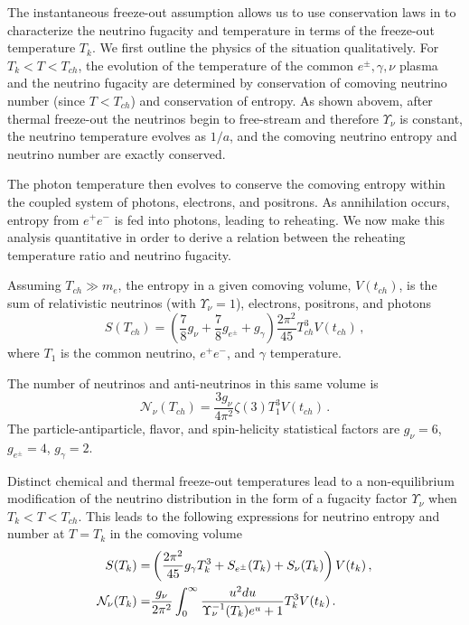 The instantaneous freeze-out assumption allows us to use conservation laws in  to characterize the neutrino fugacity and temperature in terms of the freeze-out temperature $T_k$.  We first outline the physics of the situation qualitatively. For $T_k<T<T_{ch}$, the evolution of the temperature of the common $e^\pm,\gamma,\nu$ plasma and the neutrino fugacity are determined by conservation of comoving neutrino number (since $T<T_{ch}$) and conservation of entropy.    As shown abovem, after thermal freeze-out the neutrinos begin to free-stream and therefore $\Upsilon_\nu$ is constant, the neutrino temperature evolves as $1/a$, and the comoving neutrino entropy and neutrino number are exactly conserved.  

The photon temperature then evolves to conserve the comoving entropy within the coupled system of photons, electrons, and positrons.  As annihilation occurs, entropy from $e^+e^-$ is fed into photons, leading to reheating.  We now make this analysis quantitative in order to derive a relation between the reheating temperature ratio and neutrino fugacity.

Assuming $T_{ch}\gg m_e$, the entropy in a given comoving volume, $V(t_{ch})$, is the sum of relativistic neutrinos (with $\Upsilon_\nu=1$), electrons, positrons, and photons
\begin{equation}
S(T_{ch})=\left(\frac{7}{8}g_\nu+\frac{7}{8}g_{e^\pm} +g_\gamma \right)\frac{2\pi^2}{45} T_{ch}^3V(t_{ch})\,,
\end{equation}
where $T_1$ is the common neutrino, $e^+e^-$, and $\gamma$ temperature. 

The number of neutrinos and anti-neutrinos in this same volume is
\begin{equation}
\mathcal{N}_\nu(T_{ch})=\frac{3g_\nu}{4\pi^2}\zeta(3)T_1^3V(t_{ch})\,.
\end{equation}
The particle-antiparticle, flavor, and spin-helicity statistical factors are $g_\nu=6$, $g_{e^\pm}=4$, $g_\gamma=2$.

Distinct chemical and thermal freeze-out temperatures lead to a non-equilibrium modification of the neutrino distribution in the form of a fugacity factor $\Upsilon_\nu$ when $T_k<T<T_{ch}$.  This leads to the following expressions for neutrino entropy and number at $T=T_k$ in the comoving volume
\begin{align}
S(T_k)=&\left(\frac{2\pi^2}{45}g_\gamma T_k^3+S_{e^\pm}(T_k)+S_{\nu}(T_k)\right)V(t_k)\,,\\
\mathcal{N}_{\nu}(T_k)=&\frac{g_\nu}{2\pi^2}\int_0^\infty \frac{u^2 du}{\Upsilon_\nu^{-1}(T_k)e^u+1}T_k^3V(t_k)\,.\notag
\end{align}

